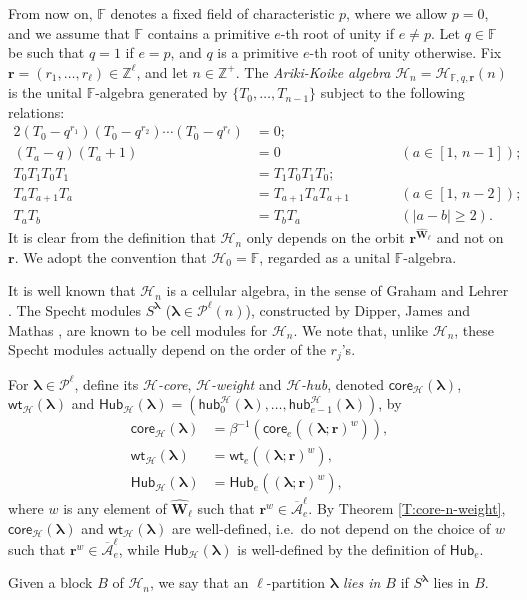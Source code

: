 \documentclass[11pt,a4paper,reqno]{amsart}
\numberwithin{equation}{section}
\theoremstyle{plain}
\theoremstyle{definition}
\theoremstyle{remark}
\numberwithin{equation}{section}
\newcommand{\bl}{\boldsymbol{\lambda}}
\newcommand{\br}{\mathbf{r}}
\newcommand{\wt}{\mathsf{wt}}
\newcommand{\core}{\mathsf{core}}
\newcommand{\HH}{\mathcal{H}}
\newcommand{\FF}{\mathbb{F}}
\newcommand{\Sp}{S}
\newcommand{\Hub}{\mathsf{Hub}}
\newcommand{\hub}{\mathsf{hub}}
\newcommand{\PP}{\mathcal{P}}
\newcommand{\EW}{\widehat{\mathbf{W}}}
\newcommand{\AAbar}{\overline{\mathcal{A}}_e^{\ell}}
\def\Z{{\mathbb Z}}
\begin{document}
From now on, $\FF$ denotes a fixed field of characteristic $p$, where we allow $p=0$, and we assume that $\FF$ contains a primitive $e$-th root of unity if $e \ne p$.
Let $q \in \FF$ be such that $q = 1$ if $e = p$, and $q$ is a primitive $e$-th root of unity otherwise.
Fix $\br = (r_1,\dotsc, r_{\ell}) \in \Z^{\ell}$, and let $n \in \Z^+$.
The {\em Ariki-Koike algebra} $\HH_n = \HH_{\FF, q, \br}(n)$ is the unital $\FF$-algebra generated by $\{ T_0,\dotsc, T_{n-1} \}$ subject to the following relations:
\begin{alignat*}{2}
(T_0 - q^{r_1})(T_0 - q^{r_2}) \dotsm (T_0 - q^{r_{\ell}}) &= 0; \\
(T_a - q)(T_a+1) &= 0 &\qquad &(a \in [1,\, n-1] ); \\
T_0T_1T_0T_1 &= T_1T_0T_1T_0; && \\
T_aT_{a+1}T_a &= T_{a+1}T_a T_{a+1} &\qquad &(a \in [1,\, n-2]); \\
T_aT_b &= T_bT_a &\qquad &(|a-b| \geq 2).
\end{alignat*}
It is clear from the definition that $\HH_n$ only depends on the orbit $\br^{\EW_{\ell}}$ and not on $\br$.
We adopt the convention that $\HH_0=\FF$, regarded as a unital $\FF$-algebra.

It is well known that $\HH_n$ is a cellular algebra, in the sense of Graham and Lehrer \cite{GL}.
The Specht modules $\Sp^{\bl}$ ($\bl \in \PP^{\ell}(n)$), constructed by Dipper, James and Mathas \cite{DJM}, are known to be cell modules for $\HH_n$.
We note that, unlike $\HH_n$, these Specht modules actually depend on the order of the $r_j$'s.


For $\bl \in \PP^{\ell}$, define its
{\em $\HH$-core}, {\em $\HH$-weight} and {\em $\HH$-hub}, denoted $\core_{\HH}(\bl)$, $\wt_{\HH}(\bl)$ and $\Hub_{\HH}(\bl) = (\hub^{\HH}_0(\bl), \dotsc, \hub^{\HH}_{e-1}(\bl)) $,
by
\begin{align*}
\core_{\HH}(\bl) &= \beta^{-1} (\core_e((\bl;\br)^w)), \\
\wt_{\HH}(\bl) &= \wt_e((\bl;\br)^w), \\
\Hub_{\HH}(\bl) & = \Hub_e((\bl;\br)^w),
\end{align*}
where $w$ is any element of $\EW_{\ell}$ such that $\br^w \in \AAbar$.
By Theorem \ref{T:core-n-weight}, $\core_{\HH}(\bl)$ and $\wt_{\HH}(\bl)$ are well-defined, i.e.\ do not depend on the choice of $w$ such that $\br^w \in \AAbar$, while $\Hub_{\HH}(\bl)$ is well-defined by the definition of $\Hub_e$.

Given a block $B$ of $\HH_n$, we say that an $\ell$-partition $\bl$ {\em lies in $B$} if $\Sp^{\bl}$ lies in $B$.
\end{document}
